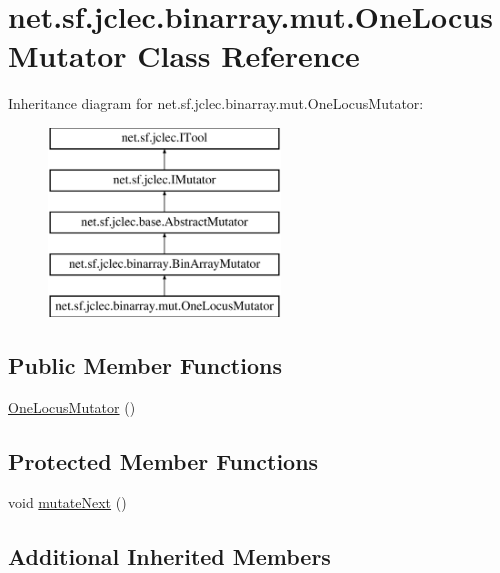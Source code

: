 \hypertarget{classnet_1_1sf_1_1jclec_1_1binarray_1_1mut_1_1_one_locus_mutator}{\section{net.\-sf.\-jclec.\-binarray.\-mut.\-One\-Locus\-Mutator Class Reference}
\label{classnet_1_1sf_1_1jclec_1_1binarray_1_1mut_1_1_one_locus_mutator}
}
Inheritance diagram for net.\-sf.\-jclec.\-binarray.\-mut.\-One\-Locus\-Mutator\-:\begin{figure}[H]
\begin{center}
\leavevmode
\includegraphics[height=5.000000cm]{classnet_1_1sf_1_1jclec_1_1binarray_1_1mut_1_1_one_locus_mutator}
\end{center}
\end{figure}
\subsection*{Public Member Functions}
\begin{DoxyCompactItemize}
\item 
\hyperlink{classnet_1_1sf_1_1jclec_1_1binarray_1_1mut_1_1_one_locus_mutator_adb05bd01ac6941a6137b5b3f1b174c09}{One\-Locus\-Mutator} ()
\end{DoxyCompactItemize}
\subsection*{Protected Member Functions}
\begin{DoxyCompactItemize}
\item 
void \hyperlink{classnet_1_1sf_1_1jclec_1_1binarray_1_1mut_1_1_one_locus_mutator_afcbf5c30ec1b952e34b188659d7bd470}{mutate\-Next} ()
\end{DoxyCompactItemize}
\subsection*{Additional Inherited Members}


